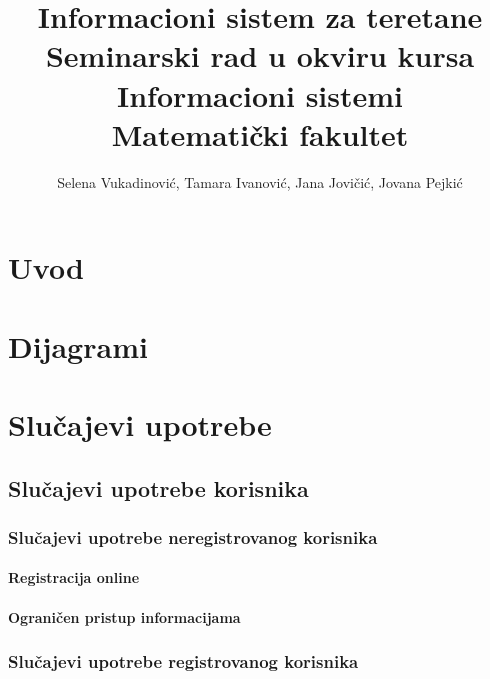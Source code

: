 \documentclass[a4paper]{article}
\begin{document}
\title{Informacioni sistem za teretane\\ \small{Seminarski rad u okviru kursa\\Informacioni sistemi\\ Matematički fakultet}}

\author{Selena Vukadinović, Tamara Ivanović, Jana Jovičić, Jovana Pejkić}


\maketitle
\newpage

\tableofcontents
\newpage

\section{Uvod}
\label{sec:uvod}


\section{Dijagrami}


\section{Slučajevi upotrebe}

\subsection{Slučajevi upotrebe korisnika}
\subsubsection{Slučajevi upotrebe neregistrovanog korisnika}
\paragraph{Registracija online}

\paragraph{Ograničen pristup informacijama}


\subsubsection{Slučajevi upotrebe registrovanog korisnika}
\end{document}

